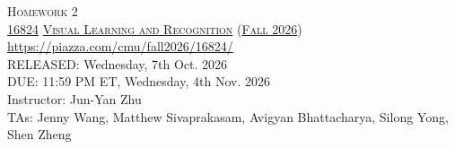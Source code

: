 \documentclass[11pt,addpoints,answers]{exam}
\title{\textsc{\hwName}} %
\author{}
\date{}
\date{}
\numberwithin{equation}{section} %
\numberwithin{figure}{section} %
\numberwithin{table}{section} %
\newcommand{\courseNum}{\href{https://visual-learning.cs.cmu.edu/}{16824}}
\newcommand{\courseName}{\href{https://visual-learning.cs.cmu.edu/}{Visual Learning and Recognition}}
\newcommand{\courseSem}{\href{https://visual-learning.cs.cmu.edu/}{Fall 2026}}
\newcommand{\courseUrl}{\url{https://piazza.com/cmu/fall2026/16824/}}
\newcommand{\hwNum}{Homework 2}
\newcommand{\hwTopic}{Generative Modelling}
\newcommand{\outDate}{Wednesday, 7th Oct. 2026}
\newcommand{\dueDate}{11:59 PM ET, Wednesday, 4th Nov. 2026}
\newcommand{\instructorName}{Jun-Yan Zhu}
\newcommand{\taNames}{Jenny Wang, Matthew Sivaprakasam, Avigyan Bhattacharya, Silong Yong, Shen Zheng}
\begin{document}
\section*{}
\begin{center}
  \textsc{\LARGE \hwNum} \\
  \vspace{1em}
  \textsc{\large \courseNum{} \courseName{} (\courseSem)} \\
  \courseUrl\\
  \vspace{1em}
  RELEASED: \outDate \\
  DUE: \dueDate \\
  Instructor: \instructorName \\
  TAs: \taNames
\end{center}
\end{document}
